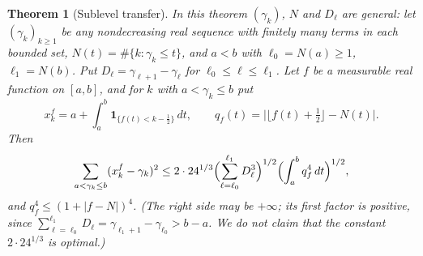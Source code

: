 \documentclass[11pt,a4paper]{article}
\numberwithin{equation}{section}
\newtheorem{theorem}{Theorem}[section]
\theoremstyle{definition}
\theoremstyle{remark}
\newcommand{\Ind}{\mathbf 1}
\begin{document}
\begin{theorem}[Sublevel transfer]\label{thm:transfer}
In this theorem $(\gamma_k)$, $N$ and $D_\ell$ are general: let $(\gamma_k)_{k\ge1}$ be any nondecreasing real sequence with finitely many terms in each bounded set, $N(t)=\#\{k:\gamma_k\le t\}$, and $a<b$ with $\ell_0=N(a)\ge1$, $\ell_1=N(b)$. Put $D_\ell=\gamma_{\ell+1}-\gamma_\ell$ for $\ell_0\le\ell\le\ell_1$. Let $f$ be a measurable real function on $[a,b]$, and for $k$ with $a<\gamma_k\le b$ put
\begin{equation}
x^f_k=a+\int_a^b\Ind_{\{f(t)<k-\frac12\}}\,dt,\qquad q_f(t)=\bigl|\lfloor f(t)+\tfrac12\rfloor-N(t)\bigr| .
\label{eq:disp_21}
\end{equation}
Then
\begin{equation}
\sum_{a<\gamma_k\le b}(x^f_k-\gamma_k)^2\le2\cdot24^{1/3}\Bigl(\sum_{\ell=\ell_0}^{\ell_1}D_\ell^3\Bigr)^{1/2}\Bigl(\int_a^bq_f^4\,dt\Bigr)^{1/2},
\label{eq:transfer}
\end{equation}
and $q_f^4\le(1+|f-N|)^4$. (The right side may be $+\infty$; its first factor is positive, since $\sum_{\ell=\ell_0}^{\ell_1}D_\ell=\gamma_{\ell_1+1}-\gamma_{\ell_0}>b-a$. We do not claim that the constant $2\cdot24^{1/3}$ is optimal.)
\end{theorem}
\end{document}
